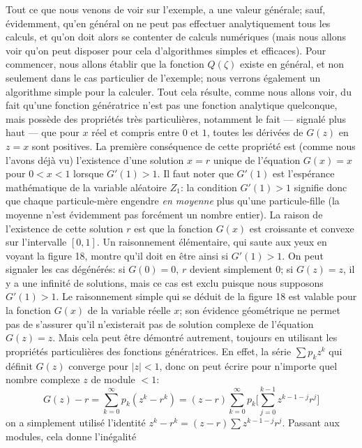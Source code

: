 Tout ce que nous venons de voir sur l'exemple, a une valeur 
g\'en\'erale; sauf, \'evidemment, qu'en g\'en\'eral on ne peut pas
effectuer  analytiquement tous les calculs, et qu'on doit alors se
contenter de calculs num\'eriques (mais nous allons voir qu'on peut
disposer pour cela d'algorithmes simples et efficaces).
\medskip
Pour commencer, nous allons \'etablir que la fonction $Q(\zeta )$ existe 
en g\'en\'eral, et non seulement dans le cas particulier de l'exemple; nous 
verrons \'egalement un algorithme simple pour la calculer. Tout cela
r\'esulte, comme nous allons voir, du fait qu'une fonction g\'en\'eratrice
n'est pas une fonction analytique quelconque, mais poss\`ede des
propri\'et\'es tr\`es particuli\`eres, notamment le fait --- signal\'e plus 
haut --- que pour $x$ r\'eel et compris entre $0$ et $1$, toutes les
d\'eriv\'ees de $G(z)$ en $z=x$ sont positives.
\medskip
La premi\`ere cons\'equence de cette propri\'et\'e est (comme nous 
l'avons d\'ej\`a vu) l'existence d'une solution $x=r$ unique de l'\'equation
$G(x) = x$ pour $0 < x < 1$ lorsque $G'(1) > 1$. Il faut noter que $G'(1)$ 
est l'esp\'erance math\'ematique de la variable al\'eatoire $Z_1$: la
condition $G'(1) > 1$ signifie donc que chaque particule-m\`ere engendre
{\it en moyenne} plus qu'une particule-fille (la moyenne n'est
\'evidemment pas forc\'ement un nombre entier).
\medskip
La raison de l'existence de cette solution $r$ est que la fonction $G(x)$
est croissante et convexe sur l'intervalle $[0,1]$. Un raisonnement
\'el\'ementaire, qui saute aux yeux en voyant la figure 18, 
montre qu'il  doit en \^etre ainsi si $G'(1) > 1$. On peut signaler les cas
d\'eg\'en\'er\'es: si  $G(0) = 0$, $r$ devient simplement $0$; si $G(z) = 
z$, il y a une infinit\'e de solutions, mais ce cas est exclu puisque nous
supposons $G'(1) > 1$. 
\medskip
Le raisonnement simple qui se d\'eduit de la figure 18 est 
valable pour  la fonction $G(x)$ de la variable r\'eelle $x$; son \'evidence
g\'eom\'etrique ne permet pas de s'assurer qu'il n'existerait pas de
solution complexe de l'\'equation $G(z) = z$. Mais cela peut \^etre
d\'emontr\'e autrement, toujours en utilisant les propri\'et\'es
particuli\`eres des fonctions g\'en\'eratrices. En effet, la s\'erie $\sum
p_k z^k$ qui d\'efinit $G(z)$ converge pour $|z| < 1$, donc on peut \'ecrire
pour n'importe quel nombre complexe $z$ de module $< 1$:
$$G(z) - r = \sum_{k=0}^{\infty } p_k (z^k - r^k) = (z-r) \sum_{k=0}^{
\infty } p_k \Biggl[ \sum_{j=0}^{k-1} z^{k-1-j}r^j \Biggr]$$ 
on a simplement utilis\'e l'identit\'e $z^k - r^k = (z-r)\sum
z^{k-1-j}r^j$. Passant aux modules, cela donne l'in\'egalit\'e
